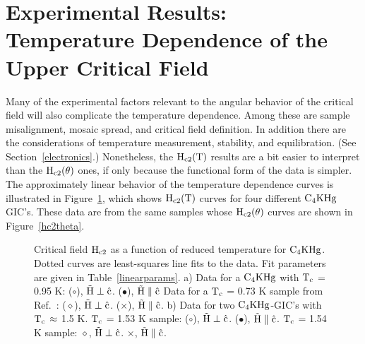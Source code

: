 \section{Experimental Results: Temperature Dependence of the Upper Critical Field}
\label{hvstdata}


         Many of the experimental factors relevant  to the angular behavior
of the critical  field   will  also complicate the temperature  dependence.
Among  these are sample misalignment,  mosaic  spread,   and critical field
definition.   In addition   there are the    considerations of  temperature
measurement, stability, and equilibration. (See Section~\ref{electronics}.)
Nonetheless, the $\rm H_{c2}(T)$ results are a bit easier to interpret than
the $\rm H_{c2}(\theta)$ ones, if  only because the  functional form of the
data is  simpler.  The  approximately linear behavior   of the  temperature
dependence curves is  illustrated in  Figure~\ref{hc2temp},  which shows $\rm
H_{c2}(T)$ curves for four  different $\rm C_4KHg $  GIC's.  These data are
from  the  same samples whose  $\rm  H_{c2}(\theta)$   curves are shown  in
Figure~\ref{hc2theta}.

\begin{figure}
\vspace{15cm}
\caption[Critical field $\rm H_{c2}$ as a function of reduced temperature
for $\rm  C_4KHg$.]{Critical field $\rm  H_{c2}$  as a function  of reduced
temperature for $\rm C_4KHg$.  Dotted curves are least-squares line fits to
the data.   Fit parameters  are given in Table~\ref{linearparams}.  a) Data
for a $\rm C_4KHg$ with $\rm T_c$  = 0.95 K:  ($\circ$), $\rm \vec{H} \perp
\hat{c}$.   ($\bullet$), $\rm  \vec{H} \parallel  \hat{c}$
Data   for  a $\rm   T_c$   =  0.73   K   sample from Ref.~\cite{tanuma81}:
($\diamond$),  $\rm  \vec{H}   \perp \hat{c}$.   ($\times$),   $\rm \vec{H}
\parallel \hat{c}$.  b) Data for two $\rm C_4KHg$-GIC's with $\rm  T_c \,
\approx$ 1.5 K.  $\rm T_c$  =  1.53 K sample:  ($\circ$), $\rm \vec{H}
\perp \hat{c}$.  ($\bullet$), $\rm \vec{H} \parallel \hat{c}$. $\rm T_c$ = 1.54
K sample: $\diamond$, $\rm \vec{H} \perp \hat{c}$.   $\times$, $\rm \vec{H}
\parallel \hat{c}$.}
\label{hc2temp}
\end{figure}



